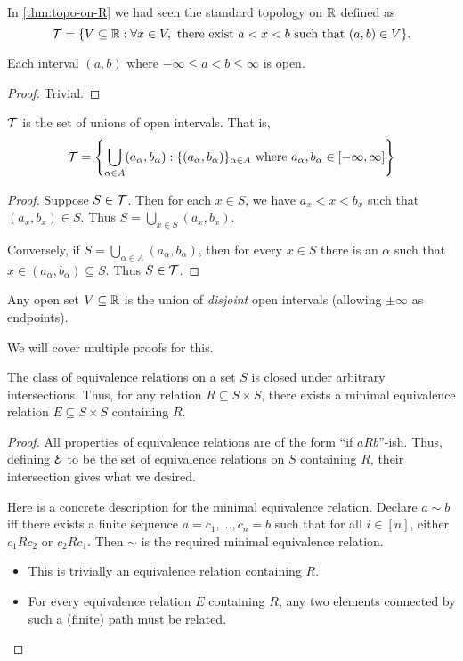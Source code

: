 In \cref{thm:topo-on-R} we had seen the standard topology on $\mathbb{R}$ defined as
\[
    \mathcal{T} = \{V \subseteq \mathbb{R} : \forall x \in V, \text{ there exist }
        a < x < b \text{ such that } (a, b) \in V\}.
\]
\begin{proposition}
    Each interval $(a, b)$ where $-\infty \le a < b \le \infty$ is open.
\end{proposition}
\begin{proof}
    Trivial.
\end{proof}

\begin{theorem}
    $\mathcal{T}$ is the set of unions of open intervals.
    That is, \[
        \T = \set*{\bigcup_{\alpha \in A} (a_\alpha, b_\alpha) :
            \set{(a_\alpha, b_\alpha)}_{\alpha \in A} \text{ where }
            a_\alpha, b_\alpha \in [-\infty, \infty]}
    \]
\end{theorem}
\begin{proof}
    Suppose $S \in \mathcal{T}$.
    Then for each $x \in S$, we have $a_x < x < b_x$ such that
    $(a_x, b_x) \in S$.
    Thus $S = \bigcup_{x \in S} (a_x, b_x)$.

    Conversely, if $S = \bigcup_{\alpha \in A} (a_\alpha, b_\alpha)$, then
    for every $x \in S$ there is an $\alpha$ such that
    $x \in (a_\alpha, b_\alpha) \subseteq S$.
    Thus $S \in \mathcal{T}$.
\end{proof}

\begin{theorem*} \label{thm:disjoint-open}
    Any open set $V \subseteq \mathbb{R}$ is the union of \emph{disjoint} open
    intervals (allowing $\pm \infty$ as endpoints).
\end{theorem*}
We will cover multiple proofs for this.
\begin{lemma*}
    The class of equivalence relations on a set $S$ is closed under
    arbitrary intersections.
    Thus, for any relation $R \subseteq S \times S$, there exists a
    minimal equivalence relation $E \subseteq S \times S$ containing $R$.
\end{lemma*}
\begin{proof}
    All properties of equivalence relations are of the form
    ``if $a R b$''-ish.
    Thus, defining $\mathcal{E}$ to be the set of equivalence relations on $S$
    containing $R$, their intersection gives what we desired.

    Here is a concrete description for the minimal equivalence relation.
    Declare $a \sim b$ iff there exists a finite sequence
    $a = c_1, \dots, c_n = b$ such that for all $i \in [n]$, either
    $c_1 R c_2$ or $c_2 R c_1$.
    Then $\sim$ is the required minimal equivalence relation.
    \begin{itemize}
        \item This is trivially an equivalence relation containing $R$.
        \item For every equivalence relation $E$ containing $R$, any two
            elements connected by such a (finite) path must be related.
            \qedhere
    \end{itemize}
\end{proof}

